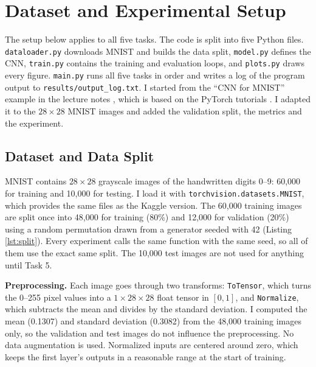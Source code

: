 \chapter{Dataset and Experimental Setup}
\label{ch:setup}


The setup below applies to all five tasks. The code is split into five
Python files.
\texttt{dataloader.py} downloads MNIST and builds the data split,
\texttt{model.py} defines the CNN, \texttt{train.py} contains the
training and evaluation loops, and \texttt{plots.py} draws every figure.
\texttt{main.py} runs all five tasks in order and writes a log of the
program output to \texttt{results/output\_log.txt}. I started from the
``CNN for MNIST'' example in the lecture notes \citep{abidl08}, which is
based on the PyTorch tutorials \citep{pytorchtutorial}. I adapted it to
the $28 \times 28$ MNIST images and added the validation split, the
metrics and the experiment.


\section{Dataset and Data Split}
\label{sec:data}

MNIST \citep{lecun1998,mnistkaggle} contains $28 \times 28$ grayscale
images of the handwritten digits 0--9: 60,000 for training and 10,000 for
testing. I load it with \texttt{torchvision.datasets.MNIST}, which
provides the same files as the Kaggle version. The 60,000 training images
are split once into 48,000 for training (80\%) and 12,000 for validation
(20\%) using a random permutation drawn from a generator seeded with 42
(Listing \ref{lst:split}). Every experiment calls the same function with
the same seed, so all of them use the exact same split. The 10,000 test
images are not used for anything until Task 5.



\textbf{Preprocessing.} Each image goes through two transforms:
\texttt{ToTensor}, which turns the 0--255 pixel values into a
$1 \times 28 \times 28$ float tensor in $[0, 1]$, and \texttt{Normalize},
which subtracts the mean and divides by the standard deviation. I
computed the mean (0.1307) and standard deviation (0.3082) from the
48,000 training images only, so the validation and test images do not
influence the preprocessing. No data augmentation is used. Normalized
inputs are centered around zero, which keeps the first layer's outputs
in a reasonable range at the start of training.



